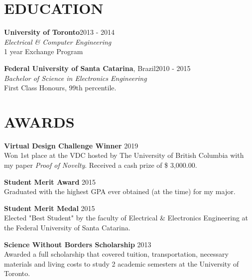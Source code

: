 \documentclass[margin, line]{res}
\begin{document}
\address{\textbf{For more information}: \url{https://dsevero.com}}
\begin{resume}

\section{EDUCATION}
\textbf{University of Toronto}\hfill 2013 - 2014\\
{\sl Electrical \& Computer Engineering}\\
1 year Exchange Program

\textbf{Federal University of Santa Catarina}, Brazil\hfill 2010 - 2015 \\
{\sl Bachelor of Science in Electronics Engineering}\\
First Class Honours, 99th percentile.

\section{AWARDS}
\textbf{Virtual Design Challenge Winner} \hfill 2019\\
Won 1st place at the VDC hosted by The University of British Columbia with my paper \emph{Proof of Novelty}. Received a cash prize of \$ 3,000.00.

\textbf{Student Merit Award} \hfill 2015\\
Graduated with the highest GPA ever obtained (at the time) for my major.

\textbf{Student Merit Medal} \hfill 2015\\
Elected "Best Student" by the faculty of Electrical \& Electronics Engineering at the Federal University of Santa Catarina.

\textbf{Science Without Borders Scholarship} \hfill 2013\\
Awarded a full scholarship that covered tuition, transportation, necessary materials and living costs to study 2 academic semesters at the University of Toronto.


\end{resume}
\end{document}

